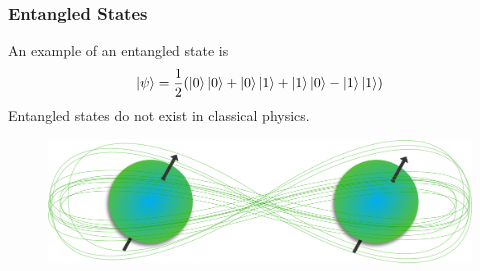 \documentclass{beamer}
\begin{document}
\begin{frame}
\frametitle{Entangled States}
An example of an entangled state is
\begin{equation}\label{eq:18}
\ket{\psi}=\frac{1}{2}(\ket{0}\ket{0}+\ket{0}\ket{1}+\ket{1}\ket{0}-\ket{1}\ket{1})
\end{equation}
Entangled states do not exist in classical physics.
\begin{figure}
\begin{center}
\includegraphics[width=0.75\linewidth]{Entangled-States-Description.png}
\end{center}
\end{figure}
\end{frame}
\end{document}
